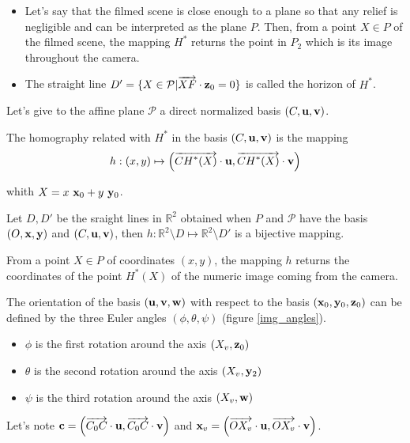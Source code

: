\begin{remarques}
\begin{itemize}
\item Let's say that the filmed scene is close enough to a plane so that any relief is negligible and can be interpreted as the plane $P$. Then, from a point $X\in P$ of the filmed scene, the mapping $H^*$ returns the point in $P_2$ which is its image throughout the camera.
\item The straight line $D'=\{ X \in \mathcal{P} | \overrightarrow{XF} \cdot \mathbf{z}_0 =0 \}$ is called the horizon of $H^*$.
\end{itemize}

\end{remarques}
Let's give to the affine plane $\mathcal{P}$ a direct normalized basis $(C,\mathbf{u},\mathbf{v})$. 
\begin{Def}
 The homography related with $H^*$ in the basis $(C,\mathbf{u},\mathbf{v})$ is the mapping
\begin{equation}
h : (x,y)  \mapsto \left( \overrightarrow{CH^*(X)}\cdot \mathbf{u} , \overrightarrow{CH^*(X)}\cdot \mathbf{v} \right)
\label{formule_homographie_H}
\end{equation}


whith $X=x~\mathbf{x}_0 + y~\mathbf{y}_0 $.
\label{def_homographie_H}
\end{Def}
Let $D,D'$ be the sraight lines in $\mathbb{R}^2$ obtained when $P$ and $\mathcal{P}$ have the basis $(O,\mathbf{x},\mathbf{y})$ and $(C,\mathbf{u},\mathbf{v})$, then $h:\mathbb{R}^2  \setminus D \mapsto \mathbb{R}^2  \setminus D'$ is a bijective mapping.
\begin{remarque}
From a point $X\in P$ of coordinates $(x,y)$, the mapping $h$ returns the coordinates of the point $H^*(X)$ of the numeric image coming from the camera. 
\end{remarque}
The orientation of the basis $(\mathbf{u},\mathbf{v},\mathbf{w})$ with respect to the basis $(\mathbf{x}_0,\mathbf{y}_0,\mathbf{z}_0)$ can be defined by the three Euler angles $(\phi , \theta ,\psi )$ (figure \ref{img_angles}).
\begin{itemize}
\item $\phi$ is the first rotation around the axis $(X_v ,\mathbf{z}_0)$
\item $\theta$ is the second rotation around the axis $(X_v , \mathbf{y}_2 )$
\item $\psi$ is the third rotation around the axis $(X_v , \mathbf{w} )$
\end{itemize}
Let's note $\mathbf{c}= \left (\overrightarrow{C_0 C}\cdot \mathbf{u} , \overrightarrow{C_0 C}\cdot \mathbf{v} \right)$ and $\mathbf{x}_v=\left( \overrightarrow{O X_v}\cdot \mathbf{u} , \overrightarrow{O X_v}\cdot \mathbf{v} \right )$.\\
